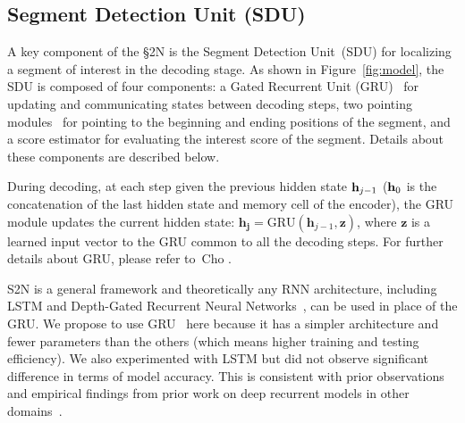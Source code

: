 \documentclass[10pt,journal,compsoc]{IEEEtran}
\begin{document}


\subsection{Segment Detection Unit (SDU)\label{sec:SDU}}
A key component of the \S2N is the Segment Detection Unit~(SDU) for localizing a segment of interest in the decoding stage. As shown in Figure~\ref{fig:model}, the SDU is composed of four components: a Gated Recurrent Unit (GRU)~\cite{cho2014learning} for updating and communicating states between decoding steps, two pointing modules~\cite{vinyals2015pointer} for pointing to the beginning and ending positions of the segment, and a score estimator for evaluating the interest score of the segment. Details about these components are described below. 

 During decoding, at each step given the previous hidden state ${\bf h}_{j-1}$ (${\bf h}_0$ is the concatenation of the last hidden state and memory cell of the encoder), the GRU module updates the current hidden state:
$\mathbf{h_{j}} = \mbox{GRU}(\mathbf{h}_{j-1}, \mathbf{z})$, where $\mathbf{z}$ is a learned input vector to the GRU common to all the decoding steps. For further details about GRU, please refer to~Cho \etal \cite{cho2014learning}. 

S2N is a general framework and theoretically any RNN architecture, including LSTM and Depth-Gated Recurrent Neural Networks~\cite{yao2015depth}, can be used in place of the GRU. We propose to use GRU~\cite{cho2014learning} here because it has a simpler architecture and fewer parameters than the others (which means higher training and testing efficiency). We also experimented with LSTM but did not observe significant difference in terms of model accuracy. This is consistent with prior observations~\cite{buch2017sst} and empirical findings from prior work on deep recurrent models in other domains~\cite{cho2014learning,jozefowicz2015empirical,chung2014empirical}.
\end{document}
